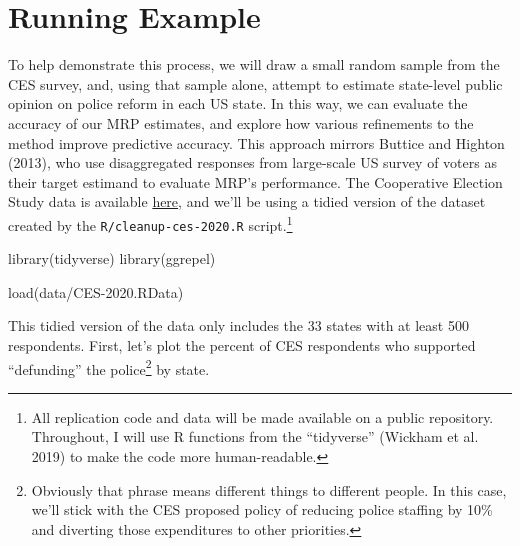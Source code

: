 \documentclass[
]{article}
\newenvironment{Shaded}{\begin{snugshade}}{\end{snugshade}}
\newcommand{\FunctionTok}[1]{\textcolor[rgb]{0.00,0.00,0.00}{#1}}
\newcommand{\NormalTok}[1]{#1}
\newcommand{\StringTok}[1]{\textcolor[rgb]{0.31,0.60,0.02}{#1}}
\begin{document}
\hypertarget{running-example}{%
\section{Running Example}\label{running-example}}

To help demonstrate this process, we will draw a small random sample
from the CES survey, and, using that sample alone, attempt to estimate
state-level public opinion on police reform in each US state. In this
way, we can evaluate the accuracy of our MRP estimates, and explore how
various refinements to the method improve predictive accuracy. This
approach mirrors Buttice and Highton (2013), who use disaggregated
responses from large-scale US survey of voters as their target estimand
to evaluate MRP's performance. The Cooperative Election Study data is
available
\href{https://dataverse.harvard.edu/dataset.xhtml?persistentId=doi\%3A10.7910/DVN/E9N6PH}{here},
and we'll be using a tidied version of the dataset created by the
\texttt{R/cleanup-ces-2020.R} script.\footnote{All replication code and
  data will be made available on a public repository. Throughout, I will
  use R functions from the ``tidyverse'' (Wickham et al. 2019) to make
  the code more human-readable.}

\begin{Shaded}
\begin{Highlighting}[]
\FunctionTok{library}\NormalTok{(tidyverse)}
\FunctionTok{library}\NormalTok{(ggrepel)}

\FunctionTok{load}\NormalTok{(}\StringTok{\textquotesingle{}data/CES{-}2020.RData\textquotesingle{}}\NormalTok{)}
\end{Highlighting}
\end{Shaded}

This tidied version of the data only includes the 33 states with at
least 500 respondents. First, let's plot the percent of CES respondents
who supported ``defunding'' the police\footnote{Obviously that phrase
  means different things to different people. In this case, we'll stick
  with the CES proposed policy of reducing police staffing by 10\% and
  diverting those expenditures to other priorities.} by state.
\end{document}
